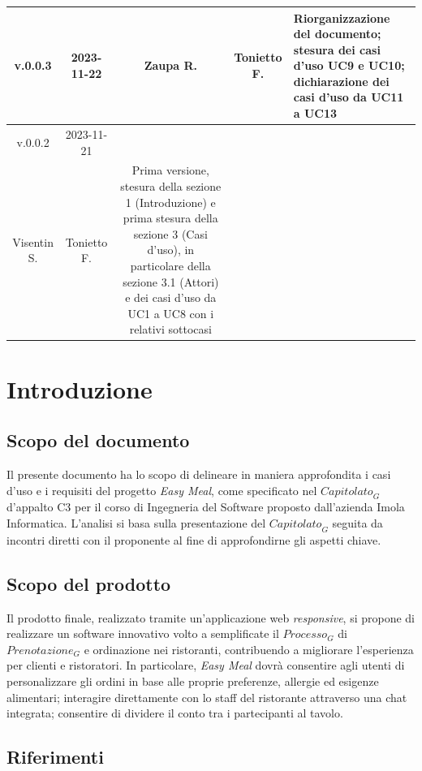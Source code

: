\documentclass[12pt, oneside]{article}
\begin{document}
\begin{longtable}{|c|c|c|c|p{7cm}|}
\hline
v.0.0.3 & 2023-11-22 & Zaupa R. & Tonietto F. & Riorganizzazione del documento; stesura dei casi d'uso UC9 e UC10; dichiarazione dei casi d'uso da UC11 a UC13 \\
\hline
v.0.0.2 & 2023-11-21 & 
  \begin{tabular}[c]{@{}c@{}}
    Zaupa R. \\
    Visentin S.
  \end{tabular} 
  & Tonietto F. & Prima versione, stesura della sezione 1 (Introduzione) e prima stesura della sezione 3 (Casi d'uso), in particolare della sezione 3.1 (Attori) e dei casi d'uso da UC1 a UC8 con i relativi sottocasi\\
\hline
\end{longtable}
\newpage

\tableofcontents
\newpage

\section{Introduzione}
\subsection{Scopo del documento}
Il presente documento ha lo scopo di delineare in maniera approfondita i casi d'uso e i requisiti del progetto \textit{Easy Meal}, come specificato nel $\textit{Capitolato}_G$ d'appalto C3 per il corso di Ingegneria del Software proposto dall'azienda Imola Informatica.
L'analisi si basa sulla presentazione del $\textit{Capitolato}_G$ seguita da incontri diretti con il proponente al fine di approfondirne gli aspetti chiave.
\subsection{Scopo del prodotto}
Il prodotto finale, realizzato tramite un'applicazione web \emph{responsive}, si propone di realizzare un software innovativo volto a semplificate il $\textit{Processo}_G$ di $\textit{Prenotazione}_G$ e ordinazione nei ristoranti, contribuendo a migliorare l'esperienza per clienti e ristoratori. In particolare, \textit{Easy Meal} dovrà consentire agli utenti di personalizzare gli ordini in base alle proprie preferenze, allergie ed esigenze alimentari; interagire direttamente con lo staff del ristorante attraverso una chat integrata; consentire di dividere il conto tra i partecipanti al tavolo.
\subsection{Riferimenti}
\end{document}

